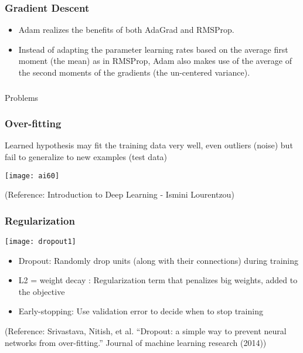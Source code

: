 \begin{frame}[fragile] \frametitle{Gradient Descent}

\begin{itemize}
\item Adam realizes the benefits of both AdaGrad and RMSProp.
\item Instead of adapting the parameter learning rates based on the average first moment (the mean) as in RMSProp, Adam also makes use of the average of the second moments of the gradients (the un-centered variance).

\end{itemize}
\end{frame}

\begin{frame}[fragile]\frametitle{}
\begin{center}
{\Large Problems}
\end{center}
\end{frame}
\begin{frame}[fragile] \frametitle{Over-fitting}
Learned hypothesis may fit the training data very well, even outliers (noise) but fail to generalize to new examples (test data)
\begin{center}
\texttt{[image: ai60]}
\end{center}
\tiny{(Reference: Introduction to Deep Learning - Ismini Lourentzou)}
\end{frame}


\begin{frame}[fragile] \frametitle{Regularization}
\begin{center}
\texttt{[image: dropout1]}
\end{center}
\begin{itemize}
\item Dropout: Randomly drop units (along with their connections) during training
\item L2 = weight decay : Regularization term that penalizes big weights, added to the objective
\item Early-stopping: Use validation error to decide when to stop training
\end{itemize}
\tiny{(Reference: Srivastava, Nitish, et al. ``Dropout: a simple way to prevent neural networks from over-fitting.'' Journal of machine learning research (2014))}
\end{frame}

